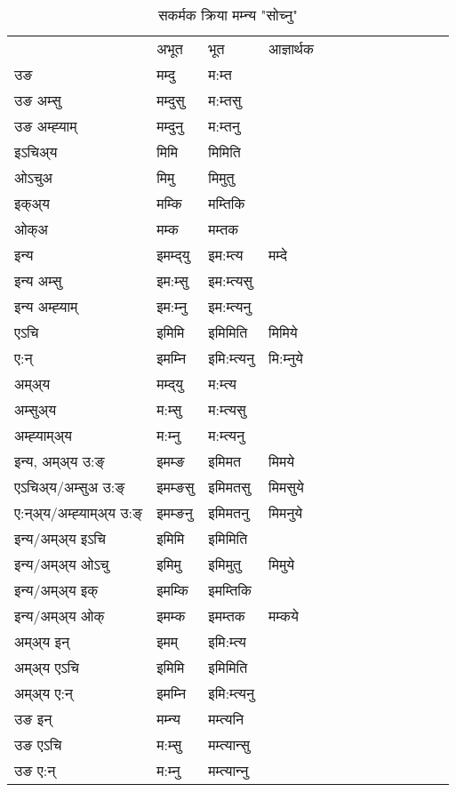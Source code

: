 \begin{table}[H]
\centering
\caption{\label{imt.vt} सकर्मक क्रिया  मम्‍न्य  "सोच्नु"  }
\begin{tabular}{l|l|l|l|l|l|l|l|l|l|l|l|l}  \toprule
&अभूत & भूत & आज्ञार्थक \\ 
उङ &मम्दु &म:म्त \\ 
उङ अम्सु&मम्दुसु &म:म्तसु \\ 
उङ अम्ह्‍याम्&मम्दुनु &म:म्तनु \\ 
इऽचिअ्य &मिमि &मिमिति   \\ 
ओऽचुअ        &मिमु &मिमुतु   \\ 
इक्अ्य&मम्कि &मम्तिकि   \\ 
ओक्अ &मम्क &मम्तक   \\ 
इन्य & इमम्द्‌यु  & इम:म्त्य &मम्दे  \\ 
इन्य अम्सु& इम:म्सु  & इम:म्त्यसु   \\ 
इन्य अम्ह्‍याम्& इम:म्‍नु  & इम:म्त्यनु   \\ 
एऽचि & इमिमि & इमिमिति &मिमिये    \\ 
ए:न् & इमम्‍नि  & इमि:म्त्यनु &मि:म्‍नुये  \\ 
अम्अ्य & मम्द्‌यु  & म:म्त्य  \\ 
अम्सुअ्य & म:म्सु & म:म्त्यसु  \\ 
अम्ह्‍याम्अ्य & म:म्‍नु  & म:म्त्यनु \\ 
\midrule
इन्य, अम्अ्य उ:ङ्‌ &इमम्ङ &इमिमत &मिमये \\ 
एऽचिअ्य/अम्सुअ उ:ङ्‌ &इमम्ङसु &इमिमतसु &मिमसुये \\ 
ए:न्अ्य/अम्ह्‍याम्अ्य उ:ङ्‌ &इमम्ङनु &इमिमतनु &मिमनुये \\ 
इन्य/अम्अ्य इऽचि &इमिमि &इमिमिति    \\ 
इन्य/अम्अ्य ओऽचु &इमिमु &इमिमुतु  &मिमुये  \\ 
इन्य/अम्अ्य इक् &इमम्कि &इमम्तिकि   \\ 
इन्य/अम्अ्य ओक् &इमम्क &इमम्तक  &मम्कये  \\ 
अम्अ्य इन् & इमम् & इमि:म्त्य   \\ 
अम्अ्य एऽचि & इमिमि & इमिमिति    \\ 
अम्अ्य ए:न् & इमम्‍नि  & इमि:म्त्यनु  \\ 
\midrule
उङ इन् & मम्‍न्य  & मम्त्यनि  \\ 
उङ एऽचि & म:म्सु  & मम्त्यान्सु   \\ 
उङ ए:न्& म:म्‍नु  & मम्त्यान्‍नु   \\ 
\bottomrule
\end{tabular}
\end{table}


